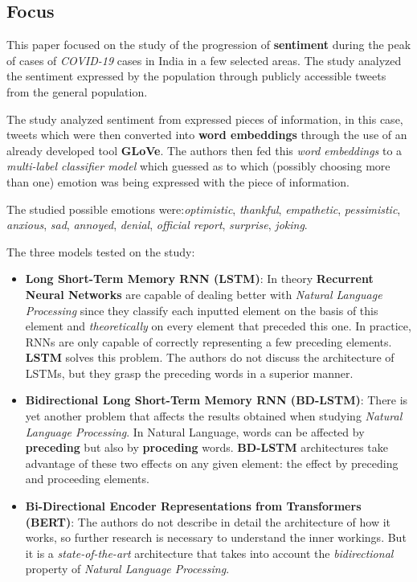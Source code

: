 \documentclass{Paper_Summary}
\begin{document}
\makepapertitle

\breakline

\begin{center}
    \section*{Focus}
\end{center}

    This paper focused on the study of the progression of \textbf{sentiment} during the peak of cases of \emph{COVID-19} cases in India in a few selected areas. The study analyzed the sentiment expressed by the population through publicly accessible tweets from the general population.

    The study analyzed sentiment from expressed pieces of information, in this case, tweets which were then converted into \textbf{word embeddings} through the use of an already developed tool \textbf{GLoVe}. The authors then fed this \emph{word embeddings} to a \emph{multi-label classifier model} which guessed as to which (possibly choosing more than one) emotion was being expressed with the piece of information.

    The studied possible emotions were:\emph{optimistic}, \emph{thankful}, \emph{empathetic}, \emph{pessimistic}, \emph{anxious}, \emph{sad}, \emph{annoyed}, \emph{denial}, \emph{official report}, \emph{surprise}, \emph{joking}.

    The three models tested on the study:
    \begin{itemize}
        \item \textbf{Long Short-Term Memory RNN (LSTM)}: In theory \textbf{Recurrent Neural Networks} are capable of dealing better with \emph{Natural Language Processing} since they classify each inputted element on the basis of this element and \emph{theoretically} on every element that preceded this one. In practice, RNNs are only capable of correctly representing a few preceding elements. \textbf{LSTM} solves this problem. The authors do not discuss the architecture of LSTMs, but they grasp the preceding words in a superior manner. 
        \item \textbf{Bidirectional Long Short-Term Memory RNN (BD-LSTM)}: There is yet another problem that affects the results obtained when studying \emph{Natural Language Processing}. In Natural Language, words can be affected by \textbf{preceding} but also by \textbf{proceding} words. \textbf{BD-LSTM} architectures take advantage of these two effects on any given element: the effect by preceding and proceeding elements.
        \item \textbf{Bi-Directional Encoder Representations from Transformers (BERT)}: The authors do not describe in detail the architecture of how it works, so further research is necessary to understand the inner workings. But it is a \emph{state-of-the-art} architecture that takes into account the \emph{bidirectional} property of \emph{Natural Language Processing}.
    \end{itemize}
\end{document}

